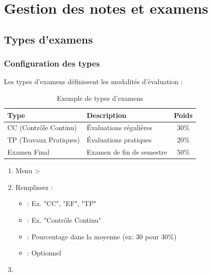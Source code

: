 \section{Gestion des notes et examens}

\subsection{Types d'examens}

\subsubsection{Configuration des types}

Les types d'examens définissent les modalités d'évaluation :

\begin{table}[h]
\centering
\begin{tabular}{|l|l|c|}
\hline
\textbf{Type} & \textbf{Description} & \textbf{Poids} \\
\hline
CC (Contrôle Continu) & Évaluations régulières & 30\% \\
TP (Travaux Pratiques) & Évaluations pratiques & 20\% \\
Examen Final & Examen de fin de semestre & 50\% \\
\hline
\end{tabular}
\caption{Exemple de types d'examens}
\end{table}

\begin{enumerate}[leftmargin=*]
    \item Menu  > 
    \item Remplissez :
    \begin{itemize}
        \item {} : Ex. "CC", "EF", "TP"
        \item {} : Ex. "Contrôle Continu"
        \item {} : Pourcentage dans la moyenne (ex: 30 pour 30\%)
        \item {} : Optionnel
    \end{itemize}
    \item {}
\end{enumerate}


